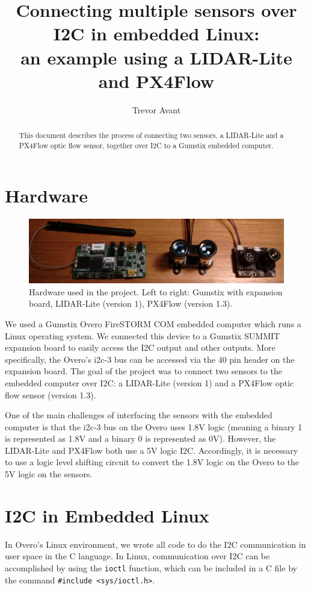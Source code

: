 \documentclass[10pt]{article}
\title{Connecting multiple sensors over I2C in embedded Linux: \\
an example using a LIDAR-Lite and PX4Flow}
\author{Trevor Avant}
\date{}
\begin{document}
\maketitle
\thispagestyle{empty}
\pagestyle{empty}


\begin{abstract}
This document describes the process of connecting two sensors, a LIDAR-Lite and a PX4Flow optic flow sensor, together over I2C to a Gumstix embedded computer.
\end{abstract}

\section*{Hardware}
\begin{figure}[ht]
\centering
\includegraphics[width=1.0\textwidth]{photos/hardware.pdf}
\caption{Hardware used in the project. Left to right: Gumstix with expansion board, LIDAR-Lite (version 1), PX4Flow (version 1.3).}
\end{figure}
We used a Gumstix Overo FireSTORM COM embedded computer which runs a Linux operating system. We connected this device to a Gumstix SUMMIT expansion board to easily access the I2C output and other outputs. More specifically, the Overo's i2c-3 bus can be accessed via the 40 pin header on the expansion board. The goal of the project was to connect two sensors to the embedded computer over I2C: a LIDAR-Lite (version 1) and a PX4Flow optic flow sensor (version 1.3).

One of the main challenges of interfacing the sensors with the embedded computer is that the i2c-3 bus on the Overo uses 1.8V logic (meaning a binary 1 is represented as 1.8V and a binary 0 is represented as 0V). However, the LIDAR-Lite and PX4Flow both use a 5V logic I2C. Accordingly, it is necessary to use a logic level shifting circuit to convert the 1.8V logic on the Overo to the 5V logic on the sensors.

\section*{I2C in Embedded Linux}
In Overo's Linux environment, we wrote all code to do the I2C communication in user space in the C language. In Linux, communication over I2C can be accomplished by using the \texttt{ioctl} function, which can be included in a C file by the command \texttt{\#include <sys/ioctl.h>}.
\end{document}
